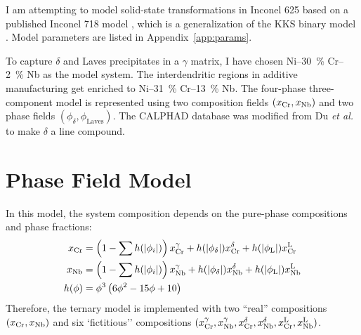 \documentclass[10pt]{article}
\begin{document}
	I am attempting to model solid-state transformations in Inconel 625 based on a published Inconel 718 model \cite{Zhou2014},
	which is a generalization of the KKS binary model \cite{Kim1999}.
	Model parameters are listed in Appendix~\ref{app:params}.
	
	To capture $\delta$ and Laves precipitates in a $\gamma$ matrix, I have chosen Ni--\SI{30}{\percent} Cr--\SI{2}{\percent} Nb as the model system.
	The interdendritic regions in additive manufacturing get enriched to Ni--\SI{31}{\percent} Cr--\SI{13}{\percent} Nb.
	The four-phase three-component model is represented using two composition fields $\left(x_{\ce{Cr}}, x_{\ce{Nb}}\right)$
	and two phase fields $\left(\phi_\delta, \phi_{\mathrm{Laves}}\right)$.
	The CALPHAD database was modified from Du \emph{et al.} \cite{Du2005} to make $\delta$ a line compound.


	\section{Phase Field Model}
		In this model, the system composition depends on the pure-phase compositions and phase fractions:
		\begin{align}
			x_{\ce{Cr}} &= \left( 1-\sum h(|\phi_i|) \right) x_{\ce{Cr}}^{\gamma}
			             + h(|\phi_\delta|) x_{\ce{Cr}}^{\delta}
			             + h(|\phi_{\mathrm{L}}|) x_{\ce{Cr}}^{\mathrm{L}}
						\label{eqn:conscr}\\
			x_{\ce{Nb}} &= \left( 1-\sum h(|\phi_i|) \right) x_{\ce{Nb}}^{\gamma}
			             + h(|\phi_\delta|) x_{\ce{Nb}}^{\delta}
			             + h(|\phi_{\mathrm{L}}|) x_{\ce{Nb}}^{\mathrm{L}}
 			             \label{eqn:consnb}\\
 			h(\phi)     &= \phi^3\left(6\phi^2 - 15\phi + 10\right)\label{eqn:interp}
		\end{align}
		Therefore, the ternary model is implemented with two ``real'' compositions $(x_{\ce{Cr}}, x_{\ce{Nb}})$ and
		six `fictitious'' compositions $(x_{\ce{Cr}}^{\gamma}, x_{\ce{Nb}}^{\gamma}, x_{\ce{Cr}}^{\delta}, x_{\ce{Nb}}^{\delta}, x_{\ce{Cr}}^{\mathrm{L}}, x_{\ce{Nb}}^{\mathrm{L}})$.
\end{document}
